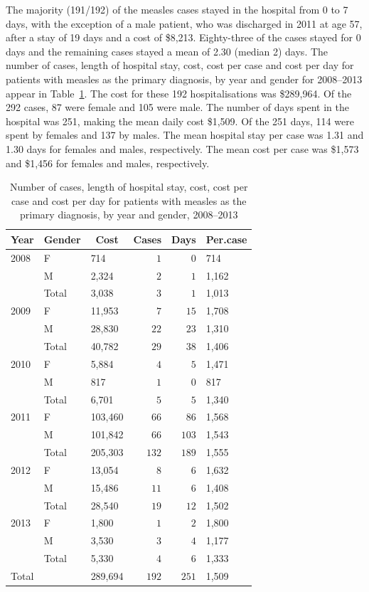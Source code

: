 \documentclass{article}
\begin{document}
{The majority (191/192) of the measles cases stayed in the hospital from 0 to 7 days, with the exception of a male patient, who was discharged in 2011 at age 57, after a stay of 19 days and a cost of \$8,213. Eighty-three of the cases stayed for 0 days and the remaining cases stayed a mean of 2.30 (median 2) days.
The number of cases, length of hospital stay, cost, cost per case and cost per day for patients with measles as the primary diagnosis, by year and gender for 2008--2013 appear in Table~\ref{table:cases}. The cost for these 192 hospitalisations was \$289,964. Of the 292 cases, 87 were female and 105 were male. The number of days spent in the hospital was 251, making the mean daily cost \$1,509. Of the 251 days, 114 were spent by females and 137 by males. The mean hospital stay per case was 1.31 and 1.30 days for females and males, respectively. The mean cost per case was \$1,573 and \$1,456 for females and males, respectively.


\begin{table}
\caption{Number of cases, length of hospital stay, cost, cost per case and cost per day for patients with measles as the primary diagnosis, by year and gender, 2008--2013}
\begin{center}
\begin{tabular}{lllrrl}
\hline\hline
\multicolumn{1}{c}{Year}&\multicolumn{1}{c}{Gender}&\multicolumn{1}{c}{Cost}&\multicolumn{1}{c}{Cases}&\multicolumn{1}{c}{Days}&\multicolumn{1}{c}{Per.case}\tabularnewline
\hline
2008&F&714&$  1$&$  0$&714\tabularnewline
&M&2,324&$  2$&$  1$&1,162\tabularnewline
                    &Total&3,038&$  3$&$  1$&1,013\tabularnewline
2009&F&11,953&$  7$&$ 15$&1,708\tabularnewline
&M&28,830&$ 22$&$ 23$&1,310\tabularnewline
                    &Total&40,782&$ 29$&$ 38$&1,406\tabularnewline
2010&F&5,884&$  4$&$  5$&1,471\tabularnewline
&M&817&$  1$&$  0$&817\tabularnewline
                    &Total&6,701&$  5$&$  5$&1,340\tabularnewline
2011&F&103,460&$ 66$&$ 86$&1,568\tabularnewline
&M&101,842&$ 66$&$103$&1,543\tabularnewline
                    &Total&205,303&$132$&$189$&1,555\tabularnewline
2012&F&13,054&$  8$&$  6$&1,632\tabularnewline
&M&15,486&$ 11$&$  6$&1,408\tabularnewline
                    &Total&28,540&$ 19$&$ 12$&1,502\tabularnewline
2013&F&1,800&$  1$&$  2$&1,800\tabularnewline
&M&3,530&$  3$&$  4$&1,177\tabularnewline
                    &Total&5,330&$  4$&$  6$&1,333\tabularnewline
Total&&289,694&$192$&$251$&1,509\tabularnewline
\hline
\end{tabular}\end{center}\label{table:cases}
\end{table}

}
\end{document}
